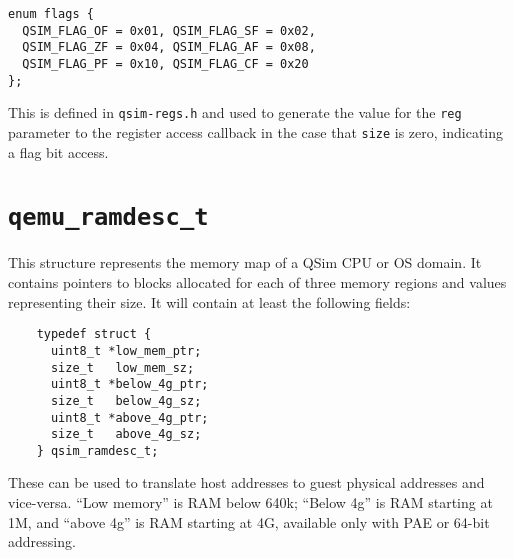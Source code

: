 \documentclass[letterpaper, 10pt]{book}
\begin{document}
\begin{verbatim}
enum flags {
  QSIM_FLAG_OF = 0x01, QSIM_FLAG_SF = 0x02,
  QSIM_FLAG_ZF = 0x04, QSIM_FLAG_AF = 0x08,
  QSIM_FLAG_PF = 0x10, QSIM_FLAG_CF = 0x20
};
\end{verbatim}

This is defined in \texttt{qsim-regs.h} and used to generate the value for the
\texttt{reg} parameter to the register access callback in the case that
\texttt{size} is zero, indicating a flag bit access.

\section{\texttt{qemu\_ramdesc\_t}} \label{struct:qemu_ramdesc_t}
This structure represents the memory map of a QSim CPU or OS domain. It
contains pointers to blocks allocated for each of three memory regions and
values representing their size. It will contain at least the following fields:

\begin{verbatim}
    typedef struct {
      uint8_t *low_mem_ptr;
      size_t   low_mem_sz;
      uint8_t *below_4g_ptr;
      size_t   below_4g_sz;
      uint8_t *above_4g_ptr;
      size_t   above_4g_sz;
    } qsim_ramdesc_t;
\end{verbatim}

These can be used to translate host addresses to guest physical addresses and 
vice-versa. ``Low memory'' is RAM below 640k; ``Below 4g'' is RAM starting at
1M, and ``above 4g'' is RAM starting at 4G, available only with PAE or 64-bit
addressing.

\newpage
\end{document}
